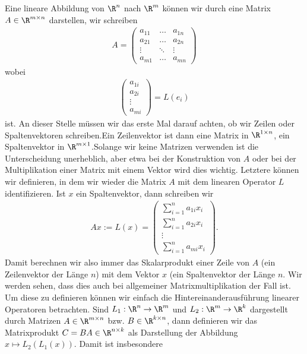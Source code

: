 \documentclass[letterpaper,10pt,english]{jupyterBook}
\begin{document}
Eine lineare Abbildung von \(\R^n\) nach \(\R^m\) können wir durch eine Matrix \(A \in \R^{m \times n}\) darstellen, wir schreiben
\begin{equation*}
\begin{split} A = \left( \begin{array}{ccc} a_{11} &\ldots& a_{1n} \\ a_{21} &\ldots &a_ {2n} \\ \vdots &\ddots &\vdots \\ a_{m1} &\ldots& a_{mn} \end{array} \right)\end{split}
\end{equation*}
wobei
\begin{equation*}
\begin{split} \left( \begin{array}{c} a_{1i} \\ a_{2i}  \\ \vdots \\ a_{mi}  \end{array} \right) = L(e_i)\end{split}
\end{equation*}
ist. An dieser Stelle müssen wir das erste Mal darauf achten, ob wir Zeilen\sphinxhyphen{} oder Spaltenvektoren schreiben.Ein Zeilenvektor ist dann eine Matrix in \(\R^{1 \times n}\), ein Spaltenvektor in \(\R^{m \times 1}\).Solange wir keine Matrizen verwenden ist die Unterscheidung unerheblich, aber etwa bei der Konstruktion von \(A\) oder bei der Multiplikation einer Matrix mit einem Vektor wird dies wichtig. Letztere können wir definieren, in dem wir wieder die Matrix \(A\) mit dem linearen Operator \(L\) identifizieren. Ist \(x\) ein Spaltenvektor, dann schreiben wir
\begin{equation*}
\begin{split} A x := L(x) = \left( \begin{array}{c} \sum_{i=1}^n a_{1i} x_i \\ \sum_{i=1}^n a_{2i} x_i \\ \vdots \\ \sum_{i=1}^n a_{mi} x_i  \end{array} \right) .\end{split}
\end{equation*}
Damit berechnen wir also immer das Skalarprodukt einer Zeile von \(A\) (ein Zeilenvektor der Länge \(n\)) mit dem Vektor \(x\) (ein Spaltenvektor der Länge \(n\). Wir werden sehen, dass dies auch bei allgemeiner Matrixmultiplikation der Fall ist. Um diese zu definieren können wir einfach die Hintereinanderausführung linearer Operatoren betrachten. Sind \(L_1: \R^n \rightarrow \R^m\) und  \(L_2: \R^m \rightarrow \R^k\) dargestellt durch Matrizen \(A \in \R^{m \times n}\) bzw. \(B \in \R^{k \times n}\), dann definieren wir das Matrixprodukt \(C = BA \in \R^{n \times k}\) als Darstellung der Abbildung \(x \mapsto L_2(L_1(x))\). Damit ist insbesondere
\end{document}
